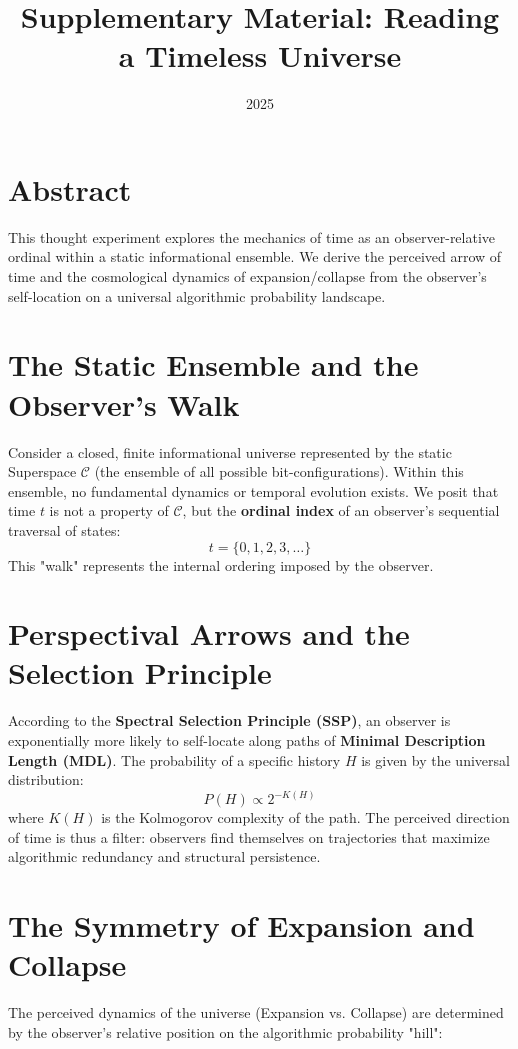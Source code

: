 \documentclass[11pt]{article}
\title{Supplementary Material: Reading a Timeless Universe}
\date{2025}
\begin{document}
\maketitle

\section*{Abstract}
This thought experiment explores the mechanics of time as an observer-relative ordinal within a static informational ensemble.
We derive the perceived arrow of time and the cosmological dynamics of expansion/collapse from the observer's self-location on a universal algorithmic probability landscape.

\section{The Static Ensemble and the Observer's Walk}
Consider a closed, finite informational universe represented by the static Superspace $\mathcal{C}$ (the ensemble of all possible bit-configurations).
Within this ensemble, no fundamental dynamics or temporal evolution exists. We posit that time $t$ is not a property of $\mathcal{C}$, but the \textbf{ordinal index} of an observer's sequential traversal of states:
\begin{equation}
    t = \{0, 1, 2, 3, \dots\}
\end{equation}
This "walk" represents the internal ordering imposed by the observer.

\section{Perspectival Arrows and the Selection Principle}
According to the \textbf{Spectral Selection Principle (SSP)}, an observer is exponentially more likely to self-locate along paths of \textbf{Minimal Description Length (MDL)}. The probability of a specific history $H$ is given by the universal distribution:
\begin{equation}
    P(H) \propto 2^{-K(H)}
\end{equation}
where $K(H)$ is the Kolmogorov complexity of the path. The perceived direction of time is thus a filter: observers find themselves on trajectories that maximize algorithmic redundancy and structural persistence.

\section{The Symmetry of Expansion and Collapse}
The perceived dynamics of the universe (Expansion vs. Collapse) are determined by the observer's relative position on the algorithmic probability "hill":
\end{document}

